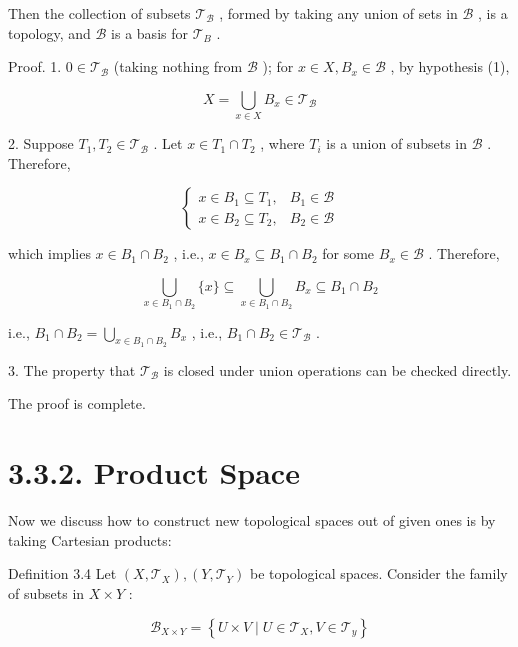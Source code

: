 Then the collection of subsets \({\mathcal{T}}_{\mathcal{B}}\) , formed by taking any union of sets in \(\mathcal{B}\) , is a topology, and \(\mathcal{B}\) is a basis for \({\mathcal{T}}_{B}\) .

Proof. 1. \(0 \in  {\mathcal{T}}_{\mathcal{B}}\) (taking nothing from \(\mathcal{B}\) ); for \(x \in  X,{B}_{x} \in  \mathcal{B}\) , by hypothesis (1),

\[
X = \mathop{\bigcup }\limits_{{x \in  X}}{B}_{x} \in  {\mathcal{T}}_{\mathcal{B}}
\]

2. Suppose \({T}_{1},{T}_{2} \in  {\mathcal{T}}_{\mathcal{B}}\) . Let \(x \in  {T}_{1} \cap  {T}_{2}\) , where \({T}_{i}\) is a union of subsets in \(\mathcal{B}\) . Therefore,

\[
\left\{  \begin{array}{ll} x \in  {B}_{1} \subseteq  {T}_{1}, & {B}_{1} \in  \mathcal{B} \\  x \in  {B}_{2} \subseteq  {T}_{2}, & {B}_{2} \in  \mathcal{B} \end{array}\right.
\]

which implies \(x \in  {B}_{1} \cap  {B}_{2}\) , i.e., \(x \in  {B}_{x} \subseteq  {B}_{1} \cap  {B}_{2}\) for some \({B}_{x} \in  \mathcal{B}\) . Therefore,

\[
\mathop{\bigcup }\limits_{{x \in  {B}_{1} \cap  {B}_{2}}}\{ x\}  \subseteq  \mathop{\bigcup }\limits_{{x \in  {B}_{1} \cap  {B}_{2}}}{B}_{x} \subseteq  {B}_{1} \cap  {B}_{2}
\]

i.e., \({B}_{1} \cap  {B}_{2} = \mathop{\bigcup }\limits_{{x \in  {B}_{1} \cap  {B}_{2}}}{B}_{x}\) , i.e., \({B}_{1} \cap  {B}_{2} \in  {\mathcal{T}}_{\mathcal{B}}\) .

3. The property that \({\mathcal{T}}_{\mathcal{B}}\) is closed under union operations can be checked directly.

The proof is complete.

\section*{3.3.2. Product Space}

Now we discuss how to construct new topological spaces out of given ones is by taking Cartesian products:

Definition 3.4 Let \(\left( {X,{\mathcal{T}}_{X}}\right) ,\left( {Y,{\mathcal{T}}_{Y}}\right)\) be topological spaces. Consider the family of subsets in \(X \times  Y\) :

\[
{\mathcal{B}}_{X \times  Y} = \left\{  {U \times  V \mid  U \in  {\mathcal{T}}_{X},V \in  {\mathcal{T}}_{y}}\right\}
\]

